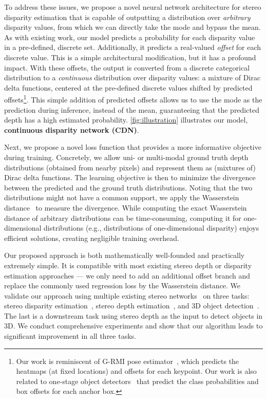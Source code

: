 \documentclass{article}
\newcommand{\eg}{e.g.\xspace}
\begin{document}
To address these issues, we propose a novel neural network architecture for stereo disparity estimation that is capable of outputting a distribution over \emph{arbitrary} disparity values, from which we can directly take the mode and bypass the mean. 
As with existing work, our model predicts a probability for each disparity value in a pre-defined, discrete set.
Additionally, it predicts a real-valued \emph{offset} for each discrete value.
This is a simple architectural modification, but it has a profound impact.
With these offsets, the output is converted from a discrete categorical distribution to a \emph{continuous} distribution 
 over disparity values: a  mixture of Dirac delta functions, centered at the pre-defined discrete values shifted by predicted offsets\footnote{Our work is reminiscent of G-RMI pose estimator~\cite{papandreou2017towards}, which predicts the heatmaps (at fixed locations) and offsets for each keypoint. Our work is also related to one-stage object detectors~\cite{redmon2016you,liu2016ssd,lin2017focal} that predict the class probabilities and box offsets for each anchor box.}.
This simple addition of predicted offsets allows us to use the mode as the prediction during inference, instead of the mean, guaranteeing that the predicted depth has a high estimated probability. \autoref{fig:illustration} illustrates our model, \textbf{continuous disparity network (CDN)}.


Next, we propose a novel loss function that provides a more informative objective during training. Concretely, we allow uni- or multi-modal ground truth depth distributions (obtained from nearby pixels) and represent them as (mixtures of) Dirac delta functions. The learning objective is then to minimize the divergence between the predicted and the ground truth distributions.
Noting that the two distributions might not have a common support, we apply the Wasserstein distance~\cite{villani2008optimal} to measure the divergence. While computing the exact Wasserstein distance of arbitrary distributions can be time-consuming, computing it for one-dimensional distributions (\eg, distributions of one-dimensional disparity) enjoys efficient solutions, creating negligible training overhead. 

Our proposed approach is both mathematically well-founded and practically extremely simple.
It is compatible with most existing stereo depth or disparity estimation approaches --- we only need to add an additional offset branch and replace the commonly used regression loss by the Wasserstein distance.
We validate our approach using multiple existing stereo networks~\cite{chang2018pyramid,you2019pseudo,zhang2019ga} on three tasks: stereo disparity estimation~\cite{mayer2016large}, stereo depth estimation~\cite{geiger2012we}, and 3D object detection~\cite{geiger2012we}. The last is a downstream task using stereo depth as the input to detect objects in 3D. We conduct comprehensive experiments and show that our algorithm leads to significant improvement in all three tasks.
\end{document}
